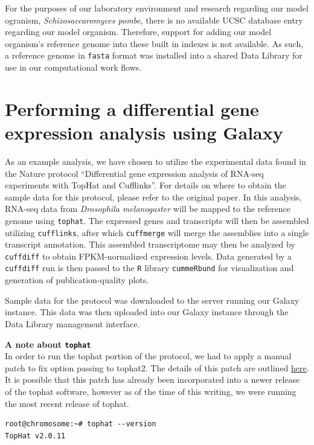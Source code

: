 \documentclass[a4paper,10pt]{article}
\begin{document}
For the purposes of our laboratory environment and research regarding our model ogranism, \textit{Schizosaccaromyces pombe}, there is no available UCSC database entry regarding our model organism.  Therefore, support for adding our model organism's reference genome into these built in indexes is not available.  As such, a reference genome in \texttt{\footnotesize{fasta}} format was installed into a shared Data Library for use in our computational work flows.  

\section{Performing a differential gene expression analysis using Galaxy}
As an example analysis, we have chosen to utilize the experimental data found in the Nature protocol ``Differential gene expression analysis of RNA-seq experiments with TopHat and Cufflinks''.\cite{protocol}  For details on where to obtain the sample data for this protocol, please refer to the original paper.  In this analysis, RNA-seq data from \textit{Drosophila melanogaster} will be mapped to the reference genome using \texttt{\footnotesize{tophat}}.\cite{tophat} The expressed genes and transcripts will then be assembled utilizing \texttt{\footnotesize{cufflinks}}\cite{cufflinks}, after which \texttt{\footnotesize{cuffmerge}} will merge the assemblies into a single transcript annotation.  This assembled transcriptome may then be analyzed by \texttt{\footnotesize{cuffdiff}} to obtain FPKM-normalized expression levels.  Data generated by a \texttt{\footnotesize{cuffdiff}} run is then passed to  the \texttt{\footnotesize{R}}\cite{R} library \texttt{\footnotesize{cummeRbund}}\cite{cummeRbund} for visualization and generation of publication-quality plots.

Sample data for the protocol was downloaded to the server running our Galaxy instance.  This data was then uploaded into our Galaxy instance through the Data Library management interface.\vspace{1em}\\
\setlength{\fboxsep}{0.5em}
\newsavebox\lstbox
\begin{lrbox}{\lstbox}
\begin{minipage}[c][][c]{.98\textwidth}
\textbf{A note about \texttt{\footnotesize{tophat}}}\\
In order to run the tophat portion of the protocol, we had to apply a manual patch to fix option passing to tophat2.  The details of this patch are outlined \href{https://groups.google.com/forum/#!topic/tuxedo-tools-users/vG5Rn0IgxoA}{here}.  It is possible that this patch has already been incorporated into a newer release of the tophat software, however as of the time of this writing, we were running the most recent release of tophat.
\begin{lstlisting}[xleftmargin=2em,xrightmargin=2em,linewidth=\textwidth]
root@chromosome:~# tophat --version
TopHat v2.0.11
\end{lstlisting}
\end{minipage}
\end{lrbox}
\end{document}
